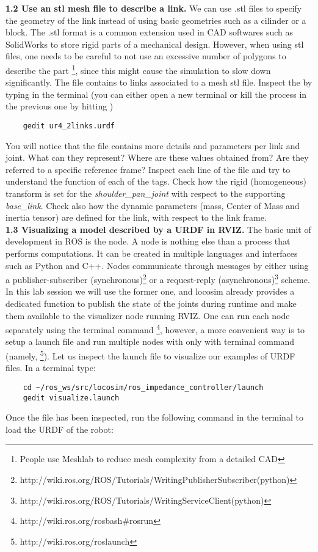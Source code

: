 \documentclass[11pt]{article}
\begin{document}
\textbf{1.2 Use an stl mesh file to describe a link.} We can use .stl files to specify the geometry of the link instead of using basic geometries such as a cilinder or a block. The .stl format is a common extension used in CAD softwares such as SolidWorks to store rigid parts of a mechanical design. However, when using stl files, one needs to be careful to not use an excessive number of polygons to describe the part \footnote{People use Meshlab to reduce mesh complexity from a detailed CAD}, since this might cause the simulation to slow down significantly. The file  contains to links associated to a mesh stl file. Inspect the  by typing in the terminal (you can either open a new terminal or kill the process in the previous one by hitting )
%
\begin{verbatim}
	gedit ur4_2links.urdf
\end{verbatim}
%
You will notice that the file contains more details and parameters per link and joint. What can they represent? Where are these values obtained from? Are they referred to a specific reference frame? Inspect each line of the file and try to understand the function of each 
of the tags. Check how the rigid (homogeneous) transform is set for the \textit{shoulder\_pan\_joint}  with respect to the supporting \textit{base\_link}. Check also how the dynamic parameters (mass, Center of Mass and inertia tensor) are defined for the link, with respect to the link frame.\\




\textbf{1.3 Visualizing a model described by a URDF in RVIZ.} The basic unit of development in ROS is the node. A node is nothing else than a process that performs computations. It can be created in multiple languages and interfaces such as Python and C++. Nodes communicate through messages by either using a publisher-subscriber (synchronous)\footnote{http://wiki.ros.org/ROS/Tutorials/WritingPublisherSubscriber(python)} or a request-reply (asynchronous)\footnote{http://wiki.ros.org/ROS/Tutorials/WritingServiceClient(python)} scheme. In this lab session we will use the former one, and locosim already provides a dedicated function to publish the state of the joints during runtime and make them available to the visualizer node running RVIZ. One can run each node separately using the terminal command \footnote{http://wiki.ros.org/rosbash\#rosrun}, however, a more convenient way is to setup a launch file and run multiple nodes with only with terminal command (namely, \footnote{http://wiki.ros.org/roslaunch}). Let us inspect the launch file to visualize our examples of URDF files. In a terminal type:
%
\begin{verbatim}
	cd ~/ros_ws/src/locosim/ros_impedance_controller/launch
	gedit visualize.launch
\end{verbatim}
%
Once the file has been inspected,  run the following command in the terminal to load the URDF of the  robot:
\end{document}
